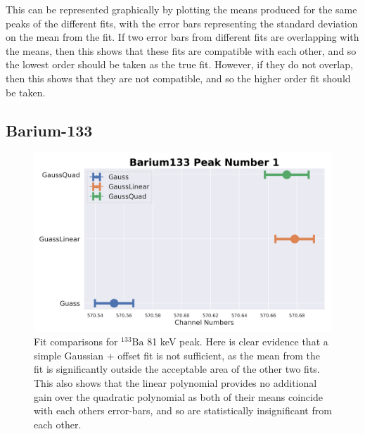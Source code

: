 \documentclass[11pt,a4paper]{article}
\newcommand{\element}[2]{$^{#2}\textrm{#1}$}
\begin{document}
This can be represented graphically by plotting the means produced for the same peaks of the different fits, with the error bars representing the standard deviation on the mean from the fit. If two error bars from different fits are overlapping with the means, then this shows that these fits are compatible with each other, and so the lowest order should be taken as the true fit. However, if they do not overlap, then this shows that they are not compatible, and so the higher order fit should be taken. 

\subsection{Barium-133}

\begin{figure}[H]
  \centering
  \includegraphics[width=0.95\linewidth]{./Images/Barium133/FitComparison_Peak1.png}
  \caption{Fit comparisons for \element{Ba}{133} 81 keV peak. Here is clear evidence that a simple Gaussian + offset fit is not sufficient, as the mean from the fit is significantly outside the acceptable area of the other two fits. This also shows that the linear polynomial provides no additional gain over the quadratic polynomial as both of their means coincide with each others error-bars, and so are statistically insignificant from each other. }
\end{figure}
\end{document}
